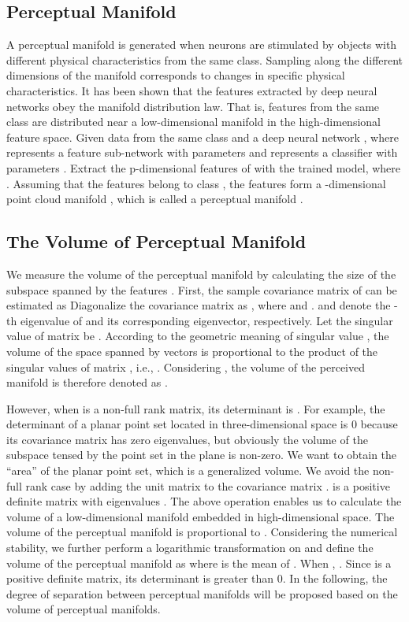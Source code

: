 \documentclass[10pt,twocolumn,letterpaper]{article}
\begin{document}
\subsection{Perceptual Manifold}
\label{sec3.1}
A perceptual manifold is generated when neurons are stimulated by objects with different physical characteristics from the same class. Sampling along the different dimensions of the manifold corresponds to changes in specific physical characteristics. It has been shown \cite{paper48,paper49} that the features extracted by deep neural networks obey the manifold distribution law. That is, features from the same class are distributed near a low-dimensional manifold in the high-dimensional feature space. Given data  from the same class and a deep neural network , where  represents a feature sub-network with parameters  and  represents a classifier with parameters . Extract the p-dimensional features  of  with the trained model, where . Assuming that the features  belong to class , the  features form a -dimensional point cloud manifold , which is called a perceptual manifold \cite{paper51}. 

\subsection{The Volume of Perceptual Manifold}
\label{sec3.2}
We measure the volume of the perceptual manifold  by calculating the size of the subspace spanned by the features . First, the sample covariance matrix of  can be estimated as 
Diagonalize the covariance matrix  as , where  and .  and  denote the -th eigenvalue of  and its corresponding eigenvector, respectively. Let the singular value of matrix  be . According to the geometric meaning of singular value \cite{paper52}, the volume of the space spanned by vectors  is proportional to the product of the singular values of matrix , i.e., . Considering , the volume of the perceived manifold is therefore denoted as .

However, when  is a non-full rank matrix, its determinant is . For example, the determinant of a planar point set located in three-dimensional space is 0 because its covariance matrix has zero eigenvalues, but obviously the volume of the subspace tensed by the point set in the plane is non-zero. We want to obtain the ``area'' of the planar point set, which is a generalized volume. We avoid the non-full rank case by adding the unit matrix  to the covariance matrix .  is a positive definite matrix with eigenvalues . The above operation enables us to calculate the volume of a low-dimensional manifold embedded in high-dimensional space. The volume  of the perceptual manifold is proportional to . Considering the numerical stability, we further perform a logarithmic transformation on  and define the volume of the perceptual manifold as  where  is the mean of . When , . Since  is a positive definite matrix, its determinant is greater than 0. In the following, the degree of separation between perceptual manifolds will be proposed based on the volume of perceptual manifolds.
\end{document}
